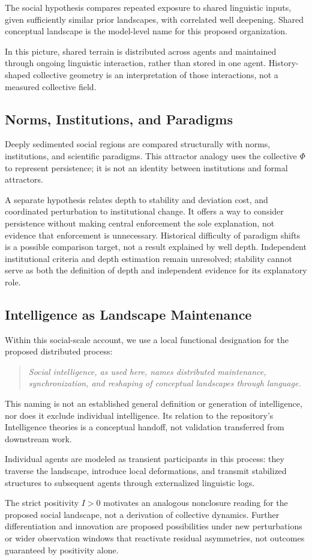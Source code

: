 The social hypothesis compares repeated exposure to shared linguistic
inputs, given sufficiently similar prior landscapes, with correlated
well deepening. Shared conceptual landscape is the model-level name
for this proposed organization.

In this picture, shared terrain is distributed across agents and
maintained through ongoing linguistic interaction, rather than stored
in one agent. History-shaped collective geometry is an interpretation
of those interactions, not a measured collective field.

\subsection{Norms, Institutions, and Paradigms}

Deeply sedimented social regions are compared structurally with norms,
institutions, and scientific paradigms.
This attractor analogy uses the collective $\Phi$ to represent persistence;
it is not an identity between institutions and formal attractors.

A separate hypothesis relates depth to stability and deviation cost,
and coordinated perturbation to institutional change. It offers a way
to consider persistence without making central enforcement the sole
explanation, not evidence that enforcement is unnecessary.
Historical difficulty of paradigm shifts is a possible comparison target,
not a result explained by well depth. Independent institutional criteria
and depth estimation remain unresolved; stability cannot serve as both
the definition of depth and independent evidence for its explanatory role.

\subsection{Intelligence as Landscape Maintenance}

Within this social-scale account, we use a local functional designation
for the proposed distributed process:
\begin{quote}
\itshape
Social intelligence, as used here, names distributed maintenance,
synchronization, and reshaping of conceptual landscapes through language.
\end{quote}

This naming is not an established general definition or generation of
intelligence, nor does it exclude individual intelligence. Its relation
to the repository's Intelligence theories is a conceptual handoff, not
validation transferred from downstream work.

Individual agents are modeled as transient participants in this process:
they traverse the landscape, introduce local deformations, and transmit
stabilized structures to subsequent agents through externalized
linguistic logs.

The strict positivity $I>0$ motivates an analogous nonclosure reading
for the proposed social landscape, not a derivation of collective dynamics.
Further differentiation and innovation are proposed possibilities under
new perturbations or wider observation windows that reactivate residual
asymmetries, not outcomes guaranteed by positivity alone.

